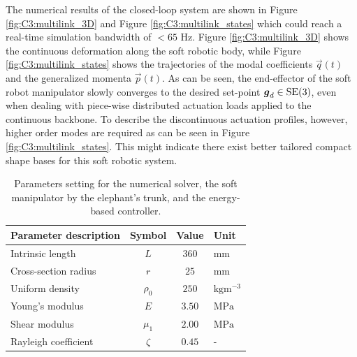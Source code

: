 \vspace{-2mm}
The numerical results of the closed-loop system are shown in Figure \ref{fig:C3:multilink_3D} and Figure \ref{fig:C3:multilink_states} which could reach a real-time simulation bandwidth of $<65$ Hz. Figure \ref{fig:C3:multilink_3D} shows the continuous deformation along the soft robotic body, while Figure \ref{fig:C3:multilink_states} shows the trajectories of the modal coefficients $\vec{q}(t)$ and the generalized momenta $\vec{p}(t)$. As can be seen, the end-effector of the soft robot manipulator slowly converges to the desired set-point $\boldsymbol{g}_d \in \textup{\textrm{SE}}(3)$, even when dealing with piece-wise distributed actuation loads applied to the continuous backbone. To describe the discontinuous actuation profiles, however, higher order modes are required as can be seen in Figure \ref{fig:C3:multilink_states}. This might indicate there exist better tailored compact shape bases for this soft robotic system.
%
\begin{table}[t]
\vspace{-0.2cm}
\caption{\small Parameters setting for the numerical solver, the soft manipulator by the elephant's trunk, and the energy-based controller.}\label{tab:C3:parameters2} \centering
\begin{tabular}{l|ccl}
  \hline
  Parameter description & Symbol    & Value    & Unit                     \\
  \hline
  \hline      
  Intrinsic length      & $L $      & $ 360$   & mm                       \\
  Cross-section radius  & $r $      & $ 25$    & $\text{mm}$              \\
  Uniform density       & $\rho_0 $ & $ 250$   & $\text{kg}\text{m}^{-3}$ \\
  Young's modulus       & $E $      & $ 3.50$    & $\text{MPa}$             \\
  Shear modulus         & $\mu_1 $  & $ 2.00 $   & $\text{MPa}$             \\
  Rayleigh coefficient  & $\zeta $  & $ 0.45 $ & -                        \\
  \hline  
\end{tabular}
\vspace{-3mm}
\end{table}
